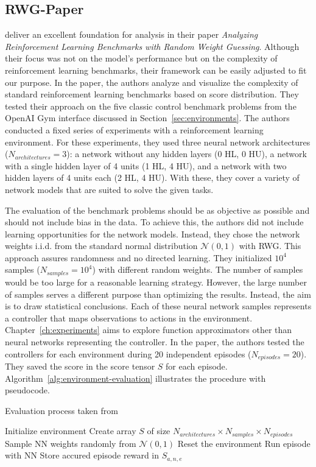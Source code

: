 \subsection{RWG-Paper}
\cite{oller_analyzing_2020} deliver an excellent foundation for analysis in their paper \emph{Analyzing Reinforcement Learning Benchmarks with Random Weight Guessing}. Although their focus was not on the model's performance but on the complexity of reinforcement learning benchmarks, their framework can be easily adjusted to fit our purpose. In the paper, the authors analyze and visualize the complexity of standard reinforcement learning benchmarks based on score distribution. They tested their approach on the five classic control benchmark problems from the OpenAI Gym interface discussed in Section~\ref{sec:environments}. The authors conducted a fixed series of experiments with a reinforcement learning environment. For these experiments, they used three neural network architectures ($N_{architectures}=3$): a network without any hidden layers (0 HL, 0 HU), a network with a single hidden layer of 4 units (1 HL, 4 HU), and a network with two hidden layers of 4 units each (2 HL, 4 HU). With these, they cover a variety of network models that are suited to solve the given tasks.

The evaluation of the benchmark problems should be as objective as possible and should not include bias in the data. To achieve this, the authors did not include learning opportunities for the network models. Instead, they chose the network weights i.i.d. from the standard normal distribution $\mathcal{N}(0,1)$ with RWG. This approach assures randomness and no directed learning. They initialized $10^4$ samples ($N_{samples}=10^4$) with different random weights. The number of samples would be too large for a reasonable learning strategy. However, the large number of samples serves a different purpose than optimizing the results. Instead, the aim is to draw statistical conclusions. Each of these neural network samples represents a controller that maps observations to actions in the environment. Chapter~\ref{ch:experiments} aims to explore function approximators other than neural networks representing the controller. In the paper, the authors tested the controllers for each environment during 20 independent episodes ($N_{episodes}=20$). They saved the score in the score tensor $S$ for each episode. Algorithm~\ref{alg:environment-evaluation} illustrates the procedure with pseudocode.

\begin{algorithm}
\caption{Evaluation process taken from \cite{oller_analyzing_2020}}
\begin{algorithmic}[1]
\State Initialize environment
\State Create array $S$ of size $N_{architectures} \times N_{samples} \times N_{episodes}$
    \State Sample NN weights randomly from $\mathcal{N}(0,1)$
      \State Reset the environment
      \State Run episode with NN
      \State Store accured episode reward in $S_{a,n,e}$
    \EndFor
\EndFor
\end{algorithmic}
\label{alg:environment-evaluation}
\end{algorithm}

